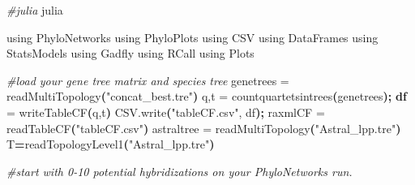 \documentclass[
  12pt,
]{article}
\newenvironment{Shaded}{\begin{snugshade}}{\end{snugshade}}
\newcommand{\CommentTok}[1]{\textcolor[rgb]{0.56,0.35,0.01}{\textit{#1}}}
\newcommand{\ErrorTok}[1]{\textcolor[rgb]{0.64,0.00,0.00}{\textbf{#1}}}
\newcommand{\ExtensionTok}[1]{#1}
\newcommand{\FunctionTok}[1]{\textcolor[rgb]{0.13,0.29,0.53}{\textbf{#1}}}
\newcommand{\KeywordTok}[1]{\textcolor[rgb]{0.13,0.29,0.53}{\textbf{#1}}}
\newcommand{\NormalTok}[1]{#1}
\newcommand{\OperatorTok}[1]{\textcolor[rgb]{0.81,0.36,0.00}{\textbf{#1}}}
\newcommand{\StringTok}[1]{\textcolor[rgb]{0.31,0.60,0.02}{#1}}
\newcommand{\VariableTok}[1]{\textcolor[rgb]{0.00,0.00,0.00}{#1}}
\begin{document}
\begin{Shaded}
\begin{Highlighting}[]
\CommentTok{\#julia}
\ExtensionTok{julia}

\ExtensionTok{using}\NormalTok{ PhyloNetworks}
\ExtensionTok{using}\NormalTok{ PhyloPlots}
\ExtensionTok{using}\NormalTok{ CSV}
\ExtensionTok{using}\NormalTok{ DataFrames}
\ExtensionTok{using}\NormalTok{ StatsModels}
\ExtensionTok{using}\NormalTok{ Gadfly}
\ExtensionTok{using}\NormalTok{ RCall}
\ExtensionTok{using}\NormalTok{ Plots}

\CommentTok{\#load your gene tree matrix and species tree}
\ExtensionTok{genetrees}\NormalTok{ = readMultiTopology}\ErrorTok{(}\StringTok{"concat\_best.tre"}\KeywordTok{)}
\ExtensionTok{q,t}\NormalTok{ = countquartetsintrees}\ErrorTok{(}\ExtensionTok{genetrees}\KeywordTok{);}
\FunctionTok{df}\NormalTok{ = writeTableCF}\ErrorTok{(}\ExtensionTok{q,t}\KeywordTok{)}
\ExtensionTok{CSV.write}\ErrorTok{(}\StringTok{"tableCF.csv"}\ExtensionTok{,}\NormalTok{ df}\KeywordTok{);}
\ExtensionTok{raxmlCF}\NormalTok{ = readTableCF}\ErrorTok{(}\StringTok{"tableCF.csv"}\KeywordTok{)}
\ExtensionTok{astraltree}\NormalTok{ = readMultiTopology}\ErrorTok{(}\StringTok{"Astral\_lpp.tre"}\KeywordTok{)}
\VariableTok{T}\OperatorTok{=}\NormalTok{readTopologyLevel1}\KeywordTok{(}\StringTok{"Astral\_lpp.tre"}\KeywordTok{)}

\CommentTok{\#start with 0{-}10 potential hybridizations on your PhyloNetworks run.}


\end{Highlighting}
\end{Shaded}
\end{document}
